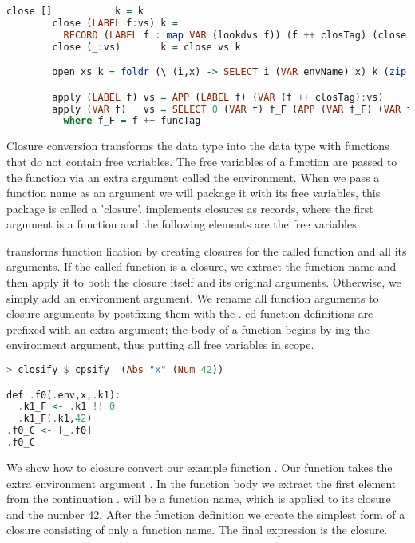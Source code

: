 {\begin{lstlisting}[language=Haskell]
        close []           k = k
        close (LABEL f:vs) k =
          RECORD (LABEL f : map VAR (lookdvs f)) (f ++ closTag) (close vs k)
        close (_:vs)       k = close vs k

        open xs k = foldr (\ (i,x) -> SELECT i (VAR envName) x) k (zip [1..] xs)

        apply (LABEL f) vs = APP (LABEL f) (VAR (f ++ closTag):vs)
        apply (VAR f)   vs = SELECT 0 (VAR f) f_F (APP (VAR f_F) (VAR f:vs))
          where f_F = f ++ funcTag
\end{lstlisting}

Closure conversion transforms the  data type into the  data type with functions that do not contain free variables. The free variables of a function are passed to the function via an extra argument called the environment. When we pass a function name as an argument we will package it with its free variables, this package is called a 'closure'.  implements closures as records, where the first argument is a function  and the following elements are the free variables.

 transforms function lication by creating closures for the called function and all its arguments. If the called function is a closure, we extract the function name and then apply it to both the closure itself and its original arguments. Otherwise, we simply add an environment argument. We rename all function arguments to closure arguments by postfixing them with the . ed function definitions are prefixed with an extra  argument; the body of a function begins by ing the environment argument, thus putting all free variables in scope.

\begin{lstlisting}[language=Haskell]
> closify $ cpsify  (Abs "x" (Num 42))

def .f0(.env,x,.k1):
  .k1_F <- .k1 !! 0
  .k1_F(.k1,42)
.f0_C <- [_.f0]
.f0_C
\end{lstlisting}

We show how to closure convert our example function . Our function  takes the extra environment argument . In the function body we extract the first element from the continuation .  will be a function name, which is applied to its closure and the number 42. After the function definition we create the simplest form of a closure consisting of only a function name. The final expression is the closure.

}
